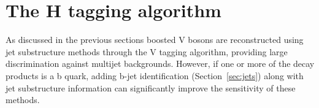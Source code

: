 
\section{The H tagging algorithm}
\label{sec:htagging}

As discussed in the previous sections boosted V bosons are reconstructed using jet substructure methods
through the V tagging algorithm, providing large discrimination against multijet backgrounds.
However, if one or more of the decay products is a b quark, adding b-jet identification (Section~\ref{sec:jets}) along
with jet substructure information can significantly improve the sensitivity of these methods.

